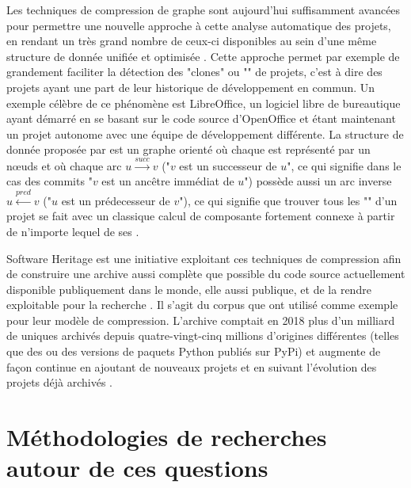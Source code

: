 Les techniques de compression de graphe sont aujourd'hui suffisamment avancées pour permettre une nouvelle
approche à cette analyse automatique des projets, en rendant un très grand nombre de ceux-ci disponibles au
sein d'une même structure de donnée unifiée et optimisée . Cette approche permet
par exemple de grandement faciliter la détection des "clones" ou "" de projets, c'est à dire des
projets ayant une part de leur historique de développement en commun. Un exemple célèbre de ce phénomène est
LibreOffice, un logiciel libre de bureautique ayant démarré en se
basant sur le code source d'OpenOffice et étant maintenant un
projet autonome avec une équipe de développement différente. La structure de donnée proposée par
\textcite{swh-graph-2020} est un graphe orienté où chaque  est représenté par un nœuds et où
chaque arc $u \xrightarrow{succ} v$ ("$v$ est un successeur de $u$", ce qui signifie dans le cas des commits
"$v$ est un ancêtre immédiat de $u$") possède aussi un arc inverse $u \xleftarrow{pred} v$ ("$u$ est un
prédecesseur de $v$"), ce qui signifie que trouver tous les "" d'un projet se fait avec un classique
calcul de composante fortement connexe à partir de n'importe lequel de ses .

Software Heritage est une initiative exploitant ces
techniques de compression afin de construire une archive aussi complète que possible du code source
actuellement disponible publiquement dans le monde, elle aussi publique, et de la rendre exploitable pour la
recherche . Il s'agit du corpus que \textcite{swh-graph-2020} ont utilisé comme
exemple pour leur modèle de compression. L'archive comptait en 2018 plus d'un milliard de 
uniques archivés depuis quatre-vingt-cinq millions d'origines différentes (telles que des 
 ou des versions de paquets Python publiés sur PyPi) et augmente
de façon continue en ajoutant de nouveaux projets et en suivant l'évolution des projets déjà archivés
.


\section{Méthodologies de recherches autour de ces questions}

